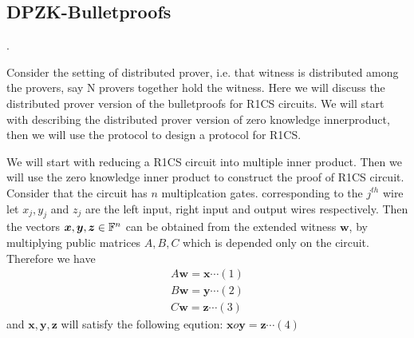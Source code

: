 
\subsection{DPZK-Bulletproofs}
.
\begin{comment}
We will give two constructions of distributed proof generation for R1CS with zero knowledge property. In the first construction we will start with reducing the proof for single prover R1CS to single prover zero knowledge inner product argument, then we will give a transformation for zero knwoledge inner product argument from single prover to multiple provers, which will directly imply the proof generation system for multiprover R1CS. In the second construction we will  
\end{comment}
Consider the setting of distributed prover, i.e. that witness is distributed among the provers, say N provers together hold the witness. Here we will discuss the distributed prover version of the bulletproofs for R1CS circuits. We will start with describing the distributed prover version of zero knowledge innerproduct, then we will use the protocol to design a protocol for R1CS.

We will start with reducing a R1CS circuit into multiple inner product. Then we will use the zero knowledge inner product to construct the proof of R1CS circuit. Consider that the circuit has $n$ multiplcation gates. corresponding to the $j^{th}$ wire let $x_j, y_j$ and $z_j$ are the left input, right input and output wires respectively. Then the vectors $\bm{x}, \bm{y}, \bm{z}\in {\mathbb F}^n$ can be obtained from the extended witness $\bm{w}$, by multiplying public matrices $A, B, C$ which is depended only on the circuit. Therefore we have 
\begin{align*}
A\bm{w}=\bm{x} \cdots (1)\\
B\bm{w}=\bm{y} \cdots (2)\\
C\bm{w}=\bm{z} \cdots (3)
\end{align*}
and $\bm{x}, \bm{y}, \bm{z}$ will satisfy the following eqution: $\bm{x} o \bm{y} =\bm{z} \cdots (4)$ 

